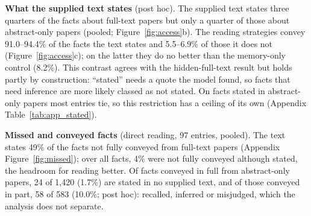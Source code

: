 \documentclass{article} %
\begin{document}
\textbf{What the supplied text states} (post hoc). The supplied text states three quarters of the facts about full-text papers but only a quarter of those about abstract-only papers (pooled; Figure~\ref{fig:access}b). The reading strategies convey 91.0--94.4\% of the facts the text states and 5.5--6.9\% of those it does not (Figure~\ref{fig:access}c); on the latter they do no better than the memory-only control (8.2\%). This contrast agrees with the hidden-full-text result but holds partly by construction: ``stated'' needs a quote the model found, so facts that need inference are more likely classed as not stated. On facts stated in abstract-only papers most entries tie, so this restriction has a ceiling of its own (Appendix Table~\ref{tab:app_stated}).

\textbf{Missed and conveyed facts} (direct reading, 97 entries, pooled). The text states 49\% of the facts not fully conveyed from full-text papers (Appendix Figure~\ref{fig:missed}); over all facts, 4\% were not fully conveyed although stated, the headroom for reading better. Of facts conveyed in full from abstract-only papers, 24 of 1,420 (1.7\%) are stated in no supplied text, and of those conveyed in part, 58 of 583 (10.0\%; post hoc): recalled, inferred or misjudged, which the analysis does not separate.
\end{document}
